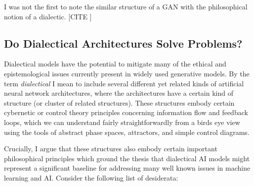\documentclass[11pt, oneside]{article}   	%
\begin{document}
I was not the first to note the similar structure of a GAN with the philosophical notion of a dialectic.  [CITE ]









\subsection{Do Dialectical Architectures Solve Problems?}

Dialectical models have the potential to mitigate many of the ethical and epistemological issues currently present in widely used generative models.   By the term  \emph{dialectical} I mean to include several different yet related kinds of artificial neural network architectures, where the architectures have a certain kind of structure (or cluster of related structures).  These structures embody certain cybernetic or control theory principles concerning information flow and feedback loops, which we can understand fairly straightforwardly from a birds eye view using the tools of abstract phase spaces, attractors, and simple control diagrams.  

Crucially, I argue that these structures also embody certain important philosophical principles which ground the thesis that dialectical AI models might represent a significant baseline for addressing many well known issues in machine learning and AI.  Consider the following list of desiderata:
\end{document}
